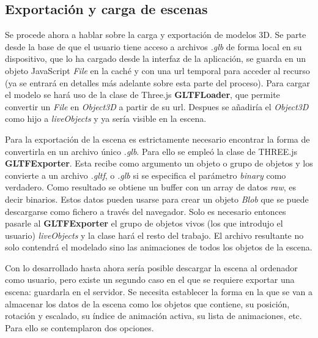 \subsection{Exportación y carga de escenas}

Se procede ahora a hablar sobre la carga y exportación de modelos 3D. Se parte desde la base de que el usuario tiene acceso a archivos \textit{.glb} de forma local en su dispositivo, que lo ha cargado desde la interfaz de la aplicación, se guarda en un objeto JavaScript \textit{File} en la caché y con una url temporal para acceder al recurso (ya se entrará en detalles más adelante sobre esta parte del proceso). Para cargar el modelo se hará uso de la clase de Three.js \textbf{GLTFLoader}, que permite convertir un \textit{File} en \textit{Object3D} a partir de su url. Despues se añadiría el \textit{Object3D} como hijo a \textit{liveObjects} y ya sería visible en la escena.

Para la exportación de la escena es estrictamente necesario encontrar la forma de convertirla en un archivo único \textit{.glb}. Para ello se empleó la clase de THREE.js \textbf{GLTFExporter}. Esta recibe como argumento un objeto o grupo de objetos y los convierte a un archivo \textit{.gltf}, o \textit{.glb} si se especifica el parámetro \textit{binary} como verdadero. Como resultado se obtiene un buffer con un array de datos \textit{raw}, es decir binarios. Estos datos pueden usarse para crear un objeto \textit{Blob} que se puede descargarse como fichero a través del navegador. Solo es necesario entonces pasarle al \textbf{GLTFExporter} el grupo de objetos vivos (los que introdujo el usuario) \textit{liveObjects} y la clase hará el resto del trabajo. El archivo resultante no solo contendrá el modelado sino las animaciones de todos los objetos de la escena.

Con lo desarrollado hasta ahora sería posible descargar la escena al ordenador como usuario, pero existe un segundo caso en el que se requiere exportar una escena: guardarla en el servidor. Se necesita establecer la forma en la que se van a almacenar los datos de la escena como los objetos que contiene, su posición, rotación y escalado, su índice de animación activa, su lista de animaciones, etc. Para ello se contemplaron dos opciones.

